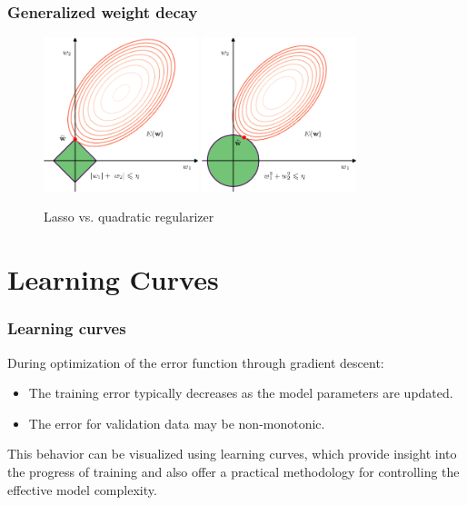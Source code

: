 \documentclass{beamer}
\begin{document}
\begin{frame}
    \frametitle{Generalized weight decay}
    \begin{figure}
        \caption{Lasso vs. quadratic regularizer}
        \includegraphics[width=0.4\textwidth]{Figure_6_a.pdf}
        \includegraphics[width=0.4\textwidth]{Figure_6_b.pdf}
    \end{figure}
\end{frame}

\section{Learning Curves}

\begin{frame}
    \frametitle{Learning curves}
    During optimization of the error function through gradient descent:
    \begin{itemize}
        \item The training error typically decreases as the model parameters are updated.
        \item The error for validation data may be non-monotonic.
    \end{itemize}
    This behavior can be visualized using learning curves, which provide insight into the progress of training and also offer a practical methodology for controlling the effective model complexity.
\end{frame}
\end{document}
